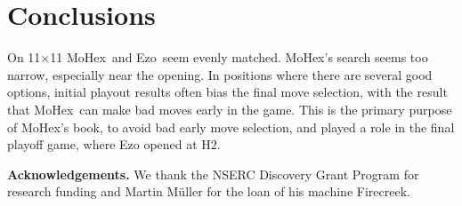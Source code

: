\documentclass{icga}
\def\Eo{\mbox{\sc Ezo}}
\def\Mx{\mbox{\sc MoHex}}
\begin{document}



\section{Conclusions}
On 11$\times$11 \Mx\ and \Eo\ seem evenly matched.
\Mx{}'s search seems too narrow, especially near the opening.
In positions where there are several good options,
initial playout results often bias the final move selection,
with the result that \Mx\ can make bad moves early in the game.
This is the primary purpose of \Mx's book, to 
avoid bad early move selection,
and played a role in the final playoff game, where
\Eo{} opened at H2.

{\bf Acknowledgements.}
We thank the NSERC Discovery Grant Program for research funding and
Martin M\"{u}ller for the loan of his machine Firecreek.

\end{document}
